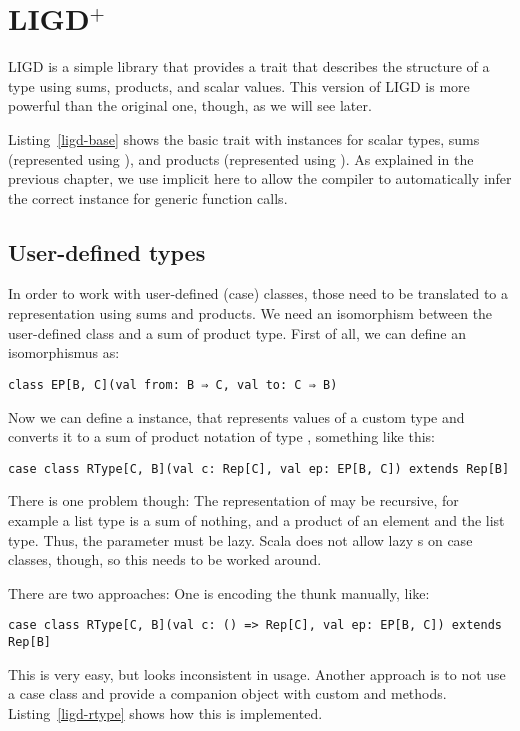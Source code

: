 \section{LIGD$^{+}$}


LIGD\cite{Cheney:2002:LIG:581690.581698} is a simple library that provides a  trait that describes
the structure of a type using sums, products, and scalar values. This
version of LIGD is more powerful than the original one, though, as we
will see later.

Listing~\ref{ligd-base} shows the basic  trait with instances for
scalar types, sums (represented using ), and products (represented
using ). As explained in the previous chapter, we use implicit
here to allow the compiler to automatically infer the correct 
instance for generic function calls.


\subsection{User-defined types}
In order to work with user-defined (case) classes, those need to be
translated to a representation using sums and products. We need an
isomorphism between the user-defined class and a sum of product type. First
of all, we can define an isomorphismus as:
\begin{lstlisting}[gobble=2]
  class EP[B, C](val from: B ⇒ C, val to: C ⇒ B)
\end{lstlisting}
Now we can define a  instance, that represents values of a custom
type  and converts it to a sum of product notation of type ,
something like this:
\begin{lstlisting}[gobble=2]
  case class RType[C, B](val c: Rep[C], val ep: EP[B, C]) extends Rep[B]
\end{lstlisting}
There is one problem though: The representation of  may be recursive,
for example a list type is a sum of nothing, and a product of an element and
the list type. Thus, the parameter  must be lazy. Scala does not allow
lazy s on case classes, though, so this needs to be worked around.

There are two approaches: One is encoding the thunk manually, like:
\begin{lstlisting}[gobble=2]
  case class RType[C, B](val c: () => Rep[C], val ep: EP[B, C]) extends Rep[B]
\end{lstlisting}
This is very easy, but looks inconsistent in usage. Another approach is to
not use a case class and provide a companion object with custom 
and  methods. Listing~\ref{ligd-rtype} shows how this is
implemented.



